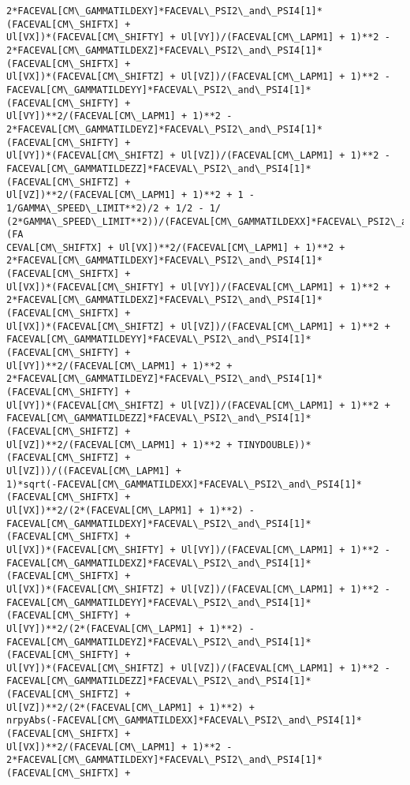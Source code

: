 \documentclass[landscape,letterpaper,10pt,english]{article}
\begin{document}
\begin{Verbatim}[commandchars=\\\{\}]
2*FACEVAL[CM\_GAMMATILDEXY]*FACEVAL\_PSI2\_and\_PSI4[1]*(FACEVAL[CM\_SHIFTX] +
Ul[VX])*(FACEVAL[CM\_SHIFTY] + Ul[VY])/(FACEVAL[CM\_LAPM1] + 1)**2 -
2*FACEVAL[CM\_GAMMATILDEXZ]*FACEVAL\_PSI2\_and\_PSI4[1]*(FACEVAL[CM\_SHIFTX] +
Ul[VX])*(FACEVAL[CM\_SHIFTZ] + Ul[VZ])/(FACEVAL[CM\_LAPM1] + 1)**2 -
FACEVAL[CM\_GAMMATILDEYY]*FACEVAL\_PSI2\_and\_PSI4[1]*(FACEVAL[CM\_SHIFTY] +
Ul[VY])**2/(FACEVAL[CM\_LAPM1] + 1)**2 -
2*FACEVAL[CM\_GAMMATILDEYZ]*FACEVAL\_PSI2\_and\_PSI4[1]*(FACEVAL[CM\_SHIFTY] +
Ul[VY])*(FACEVAL[CM\_SHIFTZ] + Ul[VZ])/(FACEVAL[CM\_LAPM1] + 1)**2 -
FACEVAL[CM\_GAMMATILDEZZ]*FACEVAL\_PSI2\_and\_PSI4[1]*(FACEVAL[CM\_SHIFTZ] +
Ul[VZ])**2/(FACEVAL[CM\_LAPM1] + 1)**2 + 1 - 1/GAMMA\_SPEED\_LIMIT**2)/2 + 1/2 - 1/
(2*GAMMA\_SPEED\_LIMIT**2))/(FACEVAL[CM\_GAMMATILDEXX]*FACEVAL\_PSI2\_and\_PSI4[1]*(FA
CEVAL[CM\_SHIFTX] + Ul[VX])**2/(FACEVAL[CM\_LAPM1] + 1)**2 +
2*FACEVAL[CM\_GAMMATILDEXY]*FACEVAL\_PSI2\_and\_PSI4[1]*(FACEVAL[CM\_SHIFTX] +
Ul[VX])*(FACEVAL[CM\_SHIFTY] + Ul[VY])/(FACEVAL[CM\_LAPM1] + 1)**2 +
2*FACEVAL[CM\_GAMMATILDEXZ]*FACEVAL\_PSI2\_and\_PSI4[1]*(FACEVAL[CM\_SHIFTX] +
Ul[VX])*(FACEVAL[CM\_SHIFTZ] + Ul[VZ])/(FACEVAL[CM\_LAPM1] + 1)**2 +
FACEVAL[CM\_GAMMATILDEYY]*FACEVAL\_PSI2\_and\_PSI4[1]*(FACEVAL[CM\_SHIFTY] +
Ul[VY])**2/(FACEVAL[CM\_LAPM1] + 1)**2 +
2*FACEVAL[CM\_GAMMATILDEYZ]*FACEVAL\_PSI2\_and\_PSI4[1]*(FACEVAL[CM\_SHIFTY] +
Ul[VY])*(FACEVAL[CM\_SHIFTZ] + Ul[VZ])/(FACEVAL[CM\_LAPM1] + 1)**2 +
FACEVAL[CM\_GAMMATILDEZZ]*FACEVAL\_PSI2\_and\_PSI4[1]*(FACEVAL[CM\_SHIFTZ] +
Ul[VZ])**2/(FACEVAL[CM\_LAPM1] + 1)**2 + TINYDOUBLE))*(FACEVAL[CM\_SHIFTZ] +
Ul[VZ]))/((FACEVAL[CM\_LAPM1] +
1)*sqrt(-FACEVAL[CM\_GAMMATILDEXX]*FACEVAL\_PSI2\_and\_PSI4[1]*(FACEVAL[CM\_SHIFTX] +
Ul[VX])**2/(2*(FACEVAL[CM\_LAPM1] + 1)**2) -
FACEVAL[CM\_GAMMATILDEXY]*FACEVAL\_PSI2\_and\_PSI4[1]*(FACEVAL[CM\_SHIFTX] +
Ul[VX])*(FACEVAL[CM\_SHIFTY] + Ul[VY])/(FACEVAL[CM\_LAPM1] + 1)**2 -
FACEVAL[CM\_GAMMATILDEXZ]*FACEVAL\_PSI2\_and\_PSI4[1]*(FACEVAL[CM\_SHIFTX] +
Ul[VX])*(FACEVAL[CM\_SHIFTZ] + Ul[VZ])/(FACEVAL[CM\_LAPM1] + 1)**2 -
FACEVAL[CM\_GAMMATILDEYY]*FACEVAL\_PSI2\_and\_PSI4[1]*(FACEVAL[CM\_SHIFTY] +
Ul[VY])**2/(2*(FACEVAL[CM\_LAPM1] + 1)**2) -
FACEVAL[CM\_GAMMATILDEYZ]*FACEVAL\_PSI2\_and\_PSI4[1]*(FACEVAL[CM\_SHIFTY] +
Ul[VY])*(FACEVAL[CM\_SHIFTZ] + Ul[VZ])/(FACEVAL[CM\_LAPM1] + 1)**2 -
FACEVAL[CM\_GAMMATILDEZZ]*FACEVAL\_PSI2\_and\_PSI4[1]*(FACEVAL[CM\_SHIFTZ] +
Ul[VZ])**2/(2*(FACEVAL[CM\_LAPM1] + 1)**2) +
nrpyAbs(-FACEVAL[CM\_GAMMATILDEXX]*FACEVAL\_PSI2\_and\_PSI4[1]*(FACEVAL[CM\_SHIFTX] +
Ul[VX])**2/(FACEVAL[CM\_LAPM1] + 1)**2 -
2*FACEVAL[CM\_GAMMATILDEXY]*FACEVAL\_PSI2\_and\_PSI4[1]*(FACEVAL[CM\_SHIFTX] +

\end{Verbatim}
\end{document}
